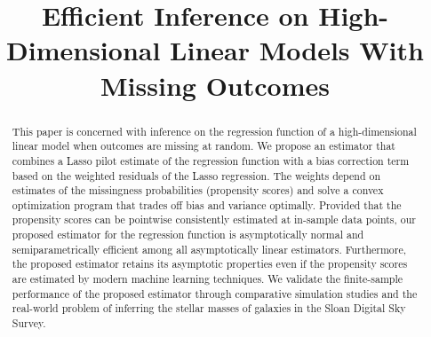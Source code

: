 \documentclass[ejsv2,noshowframe]{imsart}
\theoremstyle{plain}
\theoremstyle{definition}
\theoremstyle{remark}
\begin{document}
\begin{frontmatter}
\title{Efficient Inference on High-Dimensional Linear Models With Missing Outcomes}


\begin{abstract}
This paper is concerned with inference on the regression function of a high-dimensional linear model when outcomes are missing at random. We propose an estimator that combines a Lasso pilot estimate of the regression function with a bias correction term based on the weighted residuals of the Lasso regression. The weights depend on estimates of the missingness probabilities (propensity scores) and solve a convex optimization program that trades off bias and variance optimally.
Provided that the propensity scores can be pointwise consistently estimated at in-sample data points, our proposed estimator for the regression function is asymptotically normal and semiparametrically efficient among all asymptotically linear estimators. Furthermore, the proposed estimator retains its asymptotic properties even if the propensity scores are estimated by modern machine learning techniques.
We validate the finite-sample performance of the proposed estimator through comparative simulation studies and the real-world problem of inferring the stellar masses of galaxies in the Sloan Digital Sky Survey.
\end{abstract}


\end{frontmatter}
\end{document}
